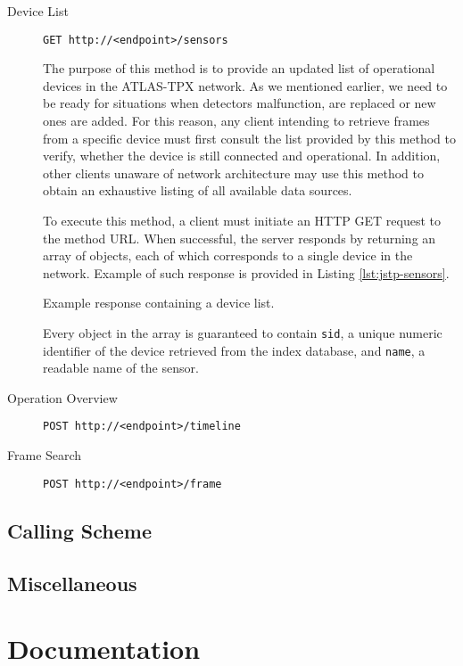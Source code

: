 \begin{description}
	\item[Device List]
	\texttt{GET http://<endpoint>/sensors}

	The purpose of this method is to provide an updated list of operational devices in the ATLAS-TPX network. As we mentioned earlier, we need to be ready for situations when detectors malfunction, are replaced or new ones are added. For this reason, any client intending to retrieve frames from a specific device must first consult the list provided by this method to verify, whether the device is still connected and operational. In addition, other clients unaware of network architecture may use this method to obtain an exhaustive listing of all available data sources.

	To execute this method, a client must initiate an HTTP GET request to the method URL. When successful, the server responds by returning an array of objects, each of which corresponds to a single device in the network. Example of such response is provided in Listing \ref{lst:jstp-sensors}.

	\begin{listing}
	    \caption{Example response containing a device list.}
	    \label{lst:jstp-sensors}
	\end{listing}

	Every object in the array is guaranteed to contain \texttt{sid}, a unique numeric identifier of the device retrieved from the index database, and \texttt{name}, a readable name of the sensor.

	\item[Operation Overview]
	\texttt{POST http://<endpoint>/timeline}


	\item[Frame Search]
	\texttt{POST http://<endpoint>/frame}
\end{description}

\subsection{Calling Scheme}

\subsection{Miscellaneous}

\section{Documentation}

